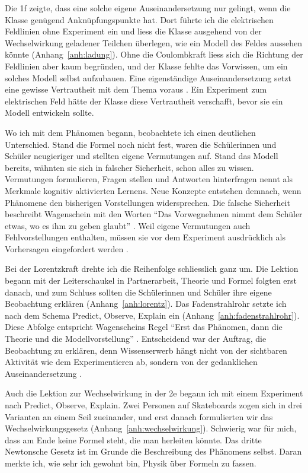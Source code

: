 \documentclass[12pt,a4paper]{article}
\begin{document}
Die 1f zeigte, dass eine solche eigene Auseinandersetzung nur gelingt, wenn
die Klasse genügend Anknüpfungspunkte hat. Dort führte ich die
elektrischen Feldlinien ohne Experiment ein und liess die Klasse ausgehend von
der Wechselwirkung geladener Teilchen überlegen, wie ein Modell des Feldes
aussehen könnte (Anhang~\ref{anh:ladung}). Ohne die Coulombkraft liess sich
die Richtung der Feldlinien aber kaum begründen, und der Klasse fehlte das
Vorwissen, um ein solches Modell selbst aufzubauen. Eine eigenständige
Auseinandersetzung setzt eine gewisse Vertrautheit mit dem Thema voraus
\parencite[7]{dejong2023}. Ein Experiment zum elektrischen Feld hätte der
Klasse diese Vertrautheit verschafft, bevor sie ein Modell entwickeln sollte.

Wo ich mit dem Phänomen begann, beobachtete ich einen deutlichen Unterschied.
Stand die Formel noch nicht fest, waren die Schülerinnen und Schüler
neugieriger und stellten eigene Vermutungen auf. Stand das Modell bereits,
wähnten sie sich in falscher Sicherheit, schon alles zu wissen. Vermutungen
formulieren, Fragen stellen und Antworten hinterfragen nennt
\textcite[92]{lipowsky2020} als Merkmale kognitiv aktivierten Lernens. Neue
Konzepte entstehen demnach, wenn Phänomene den bisherigen Vorstellungen
widersprechen. Die falsche Sicherheit beschreibt Wagenschein mit den Worten \enquote{Das
Vorwegnehmen nimmt dem Schüler etwas, wo es ihm zu geben glaubt}
\parencite[107]{wagenschein2013}. Weil eigene Vermutungen auch
Fehlvorstellungen enthalten, müssen sie vor dem Experiment ausdrücklich als
Vorhersagen eingefordert werden \parencite[43]{wilhelmschecker2018}.

Bei der Lorentzkraft drehte ich die Reihenfolge schliesslich ganz um. Die
Lektion begann mit der Leiterschaukel in Partnerarbeit, Theorie und Formel
folgten erst danach, und zum Schluss sollten die Schülerinnen und Schüler ihre
eigene Beobachtung erklären (Anhang~\ref{anh:lorentz}). Das Fadenstrahlrohr
setzte ich nach dem Schema Predict, Observe, Explain ein
(Anhang~\ref{anh:fadenstrahlrohr}). Diese Abfolge entspricht Wagenscheins Regel
\enquote{Erst das Phänomen, dann die Theorie und die Modellvorstellung}
\parencite[121]{wagenschein2013}. Entscheidend war der Auftrag, die Beobachtung
zu erklären, denn Wissenserwerb hängt nicht von der sichtbaren Aktivität wie
dem Experimentieren ab, sondern von der gedanklichen Auseinandersetzung
\parencite[449--450]{wild2020}.

Auch die Lektion zur Wechselwirkung in der 2e begann ich mit einem Experiment
nach Predict, Observe, Explain. Zwei Personen auf Skateboards zogen sich in
drei Varianten an einem Seil zueinander, und erst danach formulierten wir das
Wechselwirkungsgesetz (Anhang~\ref{anh:wechselwirkung}). Schwierig war für
mich, dass am Ende keine Formel steht, die man herleiten könnte. Das dritte
Newtonsche Gesetz ist im Grunde die Beschreibung des Phänomens selbst. Daran
merkte ich, wie sehr ich gewohnt bin, Physik über Formeln zu fassen.
\end{document}
